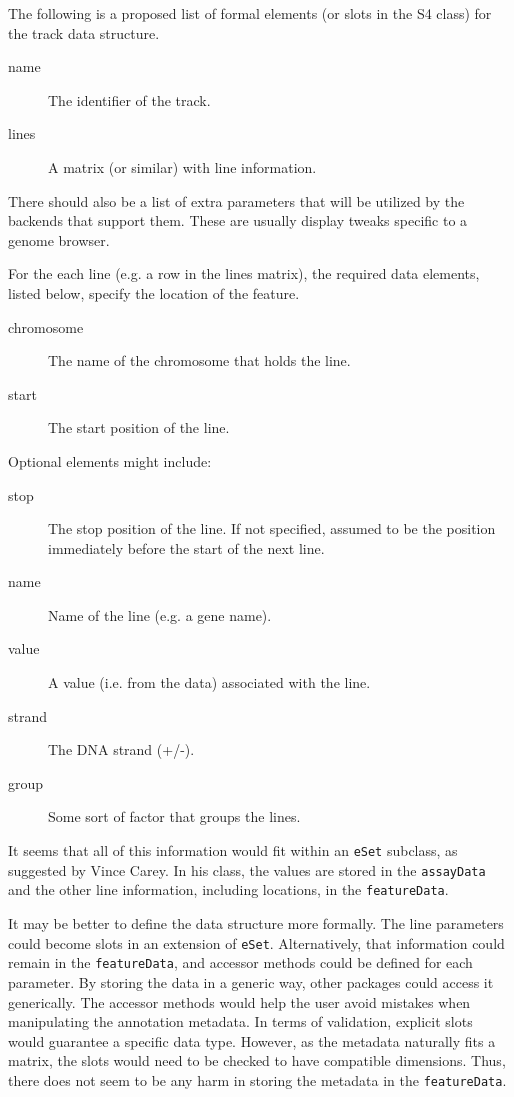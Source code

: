 \documentclass{article}
\begin{document}
The following is a proposed list of formal elements (or slots in the
S4 class) for the track data structure.
\begin{description}
\item[name] The identifier of the track.
\item[lines] A matrix (or similar) with line information.
\end{description}
There should also be a list of extra parameters that will be utilized
by the backends that support them. These are usually display tweaks
specific to a genome browser.

For the each line (e.g. a row in the lines matrix), the required data
elements, listed below, specify the location of the feature.
\begin{description}
\item[chromosome] The name of the chromosome that holds the line.
\item[start] The start position of the line.
\end{description}
Optional elements might include:
\begin{description}
\item[stop] The stop position of the line. If not specified, assumed
to be the position immediately before the start of the next line.
\item[name] Name of the line (e.g. a gene name).
\item[value] A value (i.e. from the data) associated with the line.
\item[strand] The DNA strand (+/-).
\item[group] Some sort of factor that groups the lines.
\end{description}

It seems that all of this information would fit within an
\texttt{eSet} subclass, as suggested by Vince Carey. In his
class, the values are stored in the \texttt{assayData} and the other
line information, including locations, in the \texttt{featureData}. 

It may be better to define the data structure more formally. The line
parameters could become slots in an extension of
\texttt{eSet}. Alternatively, that information could remain
in the \texttt{featureData}, and accessor methods could be defined for
each parameter. By storing the data in a generic way, other packages
could access it generically. The accessor methods would help the user
avoid mistakes when manipulating the annotation metadata. In terms of
validation, explicit slots would guarantee a specific data type.
However, as the metadata naturally fits a matrix, the slots would need
to be checked to have compatible dimensions. Thus, there does not seem
to be any harm in storing the metadata in the \texttt{featureData}.
\end{document}
